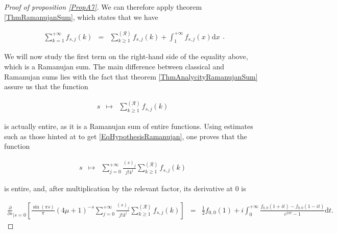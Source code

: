 \documentclass{jams-l}
\theoremstyle{definition}
\theoremstyle{remark}
\numberwithin{equation}{section}
\begin{document}
\begin{proof}[Proof of proposition \ref{PropA7}]
                \noindent We can therefore apply theorem \ref{ThmRamanujanSum}, which states that we have
                
                \[ \begin{array}{lll}
                        \sum\limits_{k = 1}^{+ \infty} f_{s,j} \left( k \right) & = & \sum\limits_{k \geqslant 1}^{\left( \mathcal{R} \right)} f_{s,j} \left( k \right) + \int_1^{+ \infty} f_{s,j} \left( x \right) \mathrm{d}x
                    \end{array} . \]
                
                \noindent We will now study the first term on the right-hand side of the equality above, which is a Ramanujan sum. The main difference between classical and Ramanujan sums lies with the fact that theorem \ref{ThmAnalycityRamanujanSum} assure us that the function
                
                \[ \begin{array}{lll}
                        s & \longmapsto & \sum\limits_{k \geqslant 1}^{\left( \mathcal{R} \right)} f_{s,j} \left( k \right)
                    \end{array} \]
                
                \noindent is actually entire, as it is a Ramanujan sum of entire functions. Using estimates such as those hinted at to get \eqref{EqHypothesisRamanujan}, one proves that the function
                
                \[ \begin{array}{lll}
                        s & \longmapsto & \sum\limits_{j = 0}^{+ \infty} \frac{\left( s \right)_j}{j! 4^j} \sum\limits_{k \geqslant 1}^{\left( \mathcal{R} \right)} f_{s,j} \left( k \right)
                    \end{array} \]
                
                \noindent is entire, and, after multiplication by the relevant factor, its derivative at $0$ is
                
                \[ \begin{array}{lll}
                        \scriptstyle \frac{\partial}{\partial s}_{\left \vert s = 0 \right.} \left[ \frac{\sin \left( \pi s \right)}{\pi} \left( 4 \mu + 1 \right)^{-s} \sum\limits_{j = 0}^{+ \infty} \frac{\left( s \right)_j}{j! 4^j} \sum\limits_{k \geqslant 1}^{\left( \mathcal{R} \right)} f_{s,j} \left( k \right) \right] & \scriptstyle = & \scriptstyle \frac{1}{2} f_{0,0} \left( 1 \right) + i \int_0^{+ \infty} \frac{f_{0,0} \left( 1 + it \right) - f_{0,0} \left( 1 - it \right)}{e^{2 \pi t} - 1} \mathrm{d}t.
                    \end{array} \]
                

\end{proof}
\end{document}
